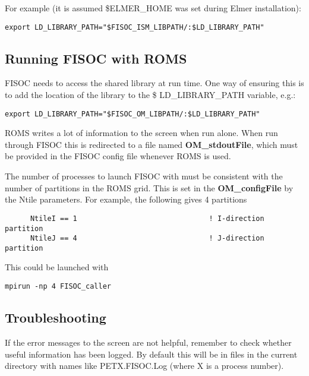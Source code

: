 \documentclass[12pt]{article}
\begin{document}
For example (it is assumed \$ELMER\_HOME was set during Elmer installation):
\begin{lstlisting}
export LD_LIBRARY_PATH="$FISOC_ISM_LIBPATH/:$LD_LIBRARY_PATH"
\end{lstlisting}


\subsection{Running FISOC with ROMS}
\label{sec:runningROMS}

FISOC needs to access the shared library at run time.  One way of ensuring this 
is to add the location of the library to the \$ LD\_LIBRARY\_PATH variable, e.g.:
\begin{lstlisting}
export LD_LIBRARY_PATH="$FISOC_OM_LIBPATH/:$LD_LIBRARY_PATH"
\end{lstlisting}

ROMS writes a lot of information to the screen when run alone.  
When run through FISOC this is redirected to a file named 
\textbf{OM\_stdoutFile}, which must be provided in the FISOC config file 
whenever ROMS is used.

The number of processes to launch FISOC with must be consistent with the number of 
partitions in the ROMS grid.  This is set in the \textbf{OM\_configFile} by the 
Ntile parameters.  For example, the following gives 4 partitions
\begin{lstlisting}
      NtileI == 1                               ! I-direction partition
      NtileJ == 4                               ! J-direction partition
\end{lstlisting}
This could be launched with
\begin{lstlisting}
mpirun -np 4 FISOC_caller
\end{lstlisting}


\subsection{Troubleshooting}

If the error messages to the screen are not helpful, remember to check whether useful 
information has been logged.  By default this will be in files in the current directory 
with names like PETX.FISOC.Log (where X is a process number).
\end{document}
